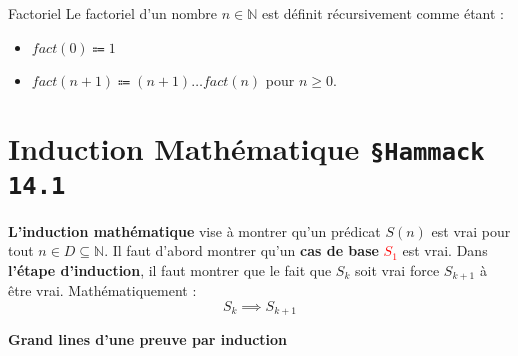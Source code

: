 \documentclass[16pt]{report}
\begin{document}
\begin{multicols*}{2}
    \begin{Definitionx}{Factoriel}{}
        Le factoriel d'un nombre $n \in \mathbb{N}$ est définit récursivement comme étant :
                \begin{itemize}
                    \item $ fact(0) \Coloneqq 1 $ 
                    \item $fact(n+1) \Coloneqq (n+1) \dots  fact(n)$ pour $n \geq 0$. 
                \end{itemize}
    \end{Definitionx}
    
    \section{Induction Mathématique \texttt{\small{\S Hammack 14.1}}}
    
    \textbf{L'induction mathématique} vise à montrer qu'un prédicat $S(n)$ est vrai pour tout 
    $n \in D \subseteq \mathbb{N}$. Il faut d'abord montrer qu'un \textbf{cas de base} 
    \textcolor{red}{$S_1$} est vrai. Dans \textbf{l'étape d'induction}, il faut montrer que le fait que $S_k$ 
    soit vrai force $S_{k+1}$ à être vrai. Mathématiquement : 
                        \[ S_k \implies S_{k+1} \]
            \begin{center}
                \textbf{Grand lines d'une preuve par induction} 
            \noindent{}
            \end{center}


\end{multicols*}
\end{document}

